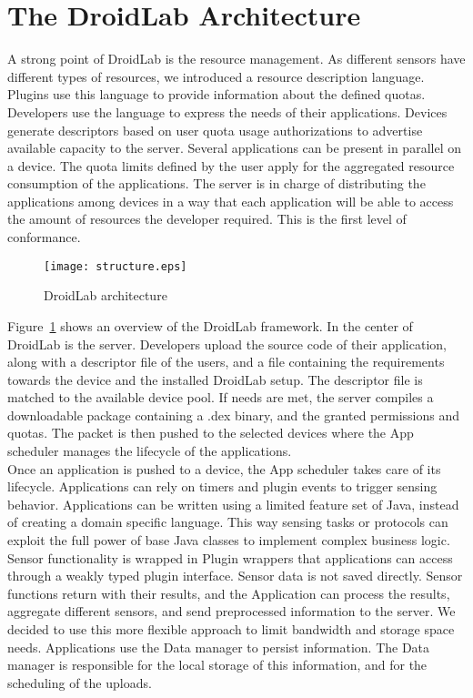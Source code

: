 \documentclass[conference,letterpaper]{IEEEtran}
\begin{document}
\section{The DroidLab Architecture}
A strong point of DroidLab is the resource management. As different sensors have different types of resources, we introduced a resource description language. Plugins use this language to provide information about the defined quotas. Developers use the language to express the needs of their applications. Devices generate descriptors based on user quota usage authorizations to advertise available capacity to the server.
Several applications can be present in parallel on a device. The quota limits defined by the user apply for the aggregated resource consumption of the applications. The server is in charge of distributing the applications among devices in a way that each application will be able to access the amount of resources the developer required. This is the first level of conformance.
\begin{figure}[h]
\centering
	\texttt{[image: structure.eps]}
	\label{fig:structureImage}
\caption{DroidLab architecture}
\end{figure}
Figure~\ref{fig:structureImage} shows an overview of the DroidLab framework. In the center of DroidLab is the server. Developers upload the source code of their application, along with a descriptor file of the users, and a file containing the requirements towards the device and the installed DroidLab setup. The descriptor file is matched to the available device pool. If needs are met, the server compiles a downloadable package containing a .dex binary, and the granted permissions and quotas. The packet is then pushed to the selected devices where the App scheduler manages the lifecycle of the applications.\\
\indent Once an application is pushed to a device, the App scheduler takes care of its lifecycle. Applications can rely on timers and plugin events to trigger sensing behavior. Applications can be written using a limited feature set of Java, instead of creating a domain specific language. This way sensing tasks or protocols can exploit the full power of base Java classes to implement complex business logic. Sensor functionality is wrapped in Plugin wrappers that applications can access through a weakly typed plugin interface. Sensor data is not saved directly. Sensor functions return with their results, and the Application can process the results, aggregate different sensors, and send preprocessed information to the server. We decided to use this more flexible approach to limit bandwidth and storage space needs. Applications use the Data manager to persist information. The Data manager is responsible for the local storage of this information, and for the scheduling of the uploads.\\
\end{document}
